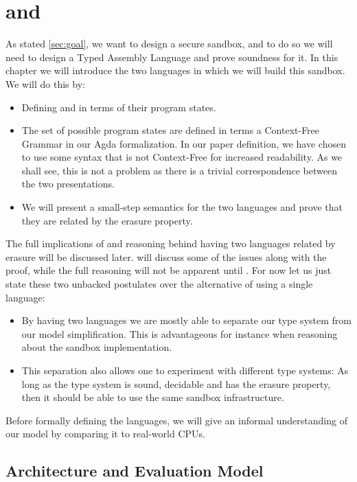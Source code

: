 \chapter{\ATAL and \ATALe}
\label{chap:lang}

As stated \cref{sec:goal}, we want to design a secure sandbox, and to do so we
will need to design a Typed Assembly Language and prove soundness for it. In
this chapter we will introduce the two languages in which we will build this
sandbox. We will do this by:

\begin{itemize}
\item Defining \ATAL and \ATALe in terms of their program states.
\item The set of possible program states are defined in terms a Context-Free
  Grammar in our Agda formalization. In our paper definition, we have chosen to
  use some syntax that is not Context-Free for increased readability. As we
  shall see, this is not a problem as there is a trivial correspondence between
  the two presentations.
\item We will present a small-step semantics for the two languages and prove
  that they are related by the erasure property.
\end{itemize}

The full implications of and reasoning behind having two languages related by
erasure will be discussed later.  will discuss some of the
issues along with the proof, while the full reasoning will not be apparent until
. For now let us just state these two unbacked postulates
over the alternative of using a single language:

\begin{itemize}
\item By having two languages we are mostly able to separate our type system
  from our model simplification. This is advantageous for instance when
  reasoning about the sandbox implementation.
\item This separation also allows one to experiment with different type systems:
  As long as the type system is sound, decidable and has the erasure property,
  then it should be able to use the same sandbox infrastructure.
\end{itemize}

Before formally defining the languages, we will give an informal understanding
of our model by comparing it to real-world CPUs.

\section{Architecture and Evaluation Model}

